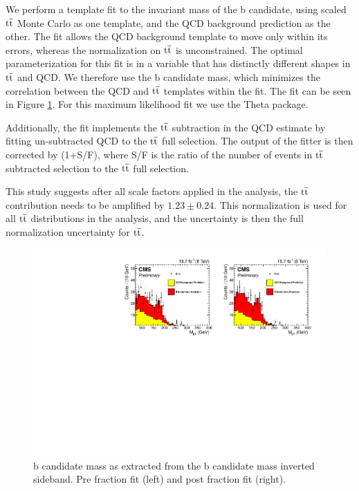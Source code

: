 We perform a template fit to the invariant mass of the b 
candidate, using scaled $\mathrm{t\overline{t}}$ Monte Carlo as one template, and the QCD background prediction as the other.  The fit allows
the QCD background template to move only within its errors, whereas the normalization on $\mathrm{t\overline{t}}$ is unconstrained. 
The optimal parameterization for this fit is in a variable that has distinctly different shapes in $\mathrm{t\overline{t}}$ and QCD.  
We therefore use the b candidate mass, which minimizes the correlation between the QCD and $\mathrm{t\overline{t}}$ templates within the fit. The fit can be seen in Figure \ref{figs:ttbarfit}.  For this maximum likelihood fit we use the Theta package.

Additionally, the fit implements the $\mathrm{t\overline{t}}$ subtraction in the QCD estimate by fitting un-subtracted QCD to the $\mathrm{t\overline{t}}$ full selection.  The output of the fitter is then corrected by  
(1+S/F), where S/F is the ratio of the number of events in $\mathrm{t\overline{t}}$ subtracted selection to the $\mathrm{t\overline{t}}$ full selection. 

This study suggests after all scale factors applied in the analysis, the $\mathrm{t\overline{t}}$ contribution needs to be amplified by $1.23 \pm 0.24$.  
This normalization is used for all $\mathrm{t\overline{t}}$ distributions in the analysis, and the uncertainty is then the full normalization uncertainty for $\mathrm{t\overline{t}}$.

\begin{figure}[htcb]
\centering
\includegraphics[width=1.0\textwidth]{AN-13-004/figs/ttbarfittingfromthetatmass}
\caption{b candidate mass as extracted from the b candidate mass inverted sideband.  Pre fraction fit (left) and post fraction fit (right).}
\label{figs:ttbarfit}
\end{figure}




